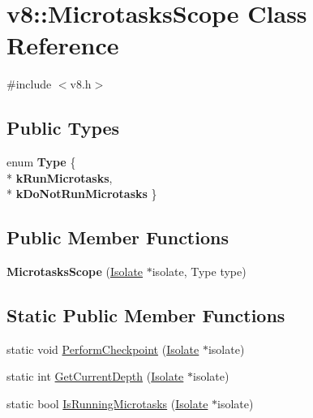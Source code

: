 \hypertarget{classv8_1_1_microtasks_scope}{}\section{v8\+:\+:Microtasks\+Scope Class Reference}
\label{classv8_1_1_microtasks_scope}


{\ttfamily \#include $<$v8.\+h$>$}

\subsection*{Public Types}
\begin{DoxyCompactItemize}
\item 
enum {\bfseries Type} \{ \\*
{\bfseries k\+Run\+Microtasks}, 
\\*
{\bfseries k\+Do\+Not\+Run\+Microtasks}
 \}\hypertarget{classv8_1_1_microtasks_scope_a826cf210978221741a0467cd9be6996f}{}\label{classv8_1_1_microtasks_scope_a826cf210978221741a0467cd9be6996f}

\end{DoxyCompactItemize}
\subsection*{Public Member Functions}
\begin{DoxyCompactItemize}
\item 
{\bfseries Microtasks\+Scope} (\hyperlink{classv8_1_1_isolate}{Isolate} $\ast$isolate, Type type)\hypertarget{classv8_1_1_microtasks_scope_a40348ac94c7e9ea405c2546d94d9d927}{}\label{classv8_1_1_microtasks_scope_a40348ac94c7e9ea405c2546d94d9d927}

\end{DoxyCompactItemize}
\subsection*{Static Public Member Functions}
\begin{DoxyCompactItemize}
\item 
static void \hyperlink{classv8_1_1_microtasks_scope_a7c181251fc02bd2b5a1051e5de8fe4ed}{Perform\+Checkpoint} (\hyperlink{classv8_1_1_isolate}{Isolate} $\ast$isolate)
\item 
static int \hyperlink{classv8_1_1_microtasks_scope_a4ae6e290dff532252ebbca9c11829dbd}{Get\+Current\+Depth} (\hyperlink{classv8_1_1_isolate}{Isolate} $\ast$isolate)
\item 
static bool \hyperlink{classv8_1_1_microtasks_scope_a0a07be94ea87994bcfa79c9e6eb73164}{Is\+Running\+Microtasks} (\hyperlink{classv8_1_1_isolate}{Isolate} $\ast$isolate)
\end{DoxyCompactItemize}
